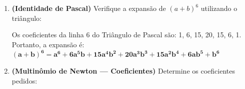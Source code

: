 \documentclass[12pt]{article}
\begin{document}
\begin{enumerate}
\begin{solucao}
\begin{enumerate}[label=\alph*)]
    \item \textbf{5º termo de $(2x + y)^8$:} \\
    $T_{k+1} = \binom{n}{k}a^{n-k}b^k$. Para o 5º termo, $k = 4$. \\
    $T_5 = \binom{8}{4}(2x)^{8-4}(y)^4 = 70 \cdot (2x)^4 \cdot y^4 = 70 \cdot 16x^4 \cdot y^4 = \mathbf{1120x^4y^4}$

    \item \textbf{Coeficiente de $x^3$ em $(1 + 3x)^7$:} \\
    $T_{k+1} = \binom{7}{k}(1)^{7-k}(3x)^k = \binom{7}{k} 3^k x^k$. \\
    Para $x^3$, temos $k = 3$. \\
    $T_4 = \binom{7}{3} 3^3 x^3 = 35 \cdot 27 x^3 = 945 x^3$. \\
    O coeficiente é \textbf{945}.

    \item \textbf{Termo independente de $x$ em $(x^2 - 1/x)^9$:} \\
    $T_{k+1} = \binom{9}{k}(x^2)^{9-k}(-x^{-1})^k = \binom{9}{k} x^{18-2k} (-1)^k x^{-k} = \binom{9}{k} (-1)^k x^{18-3k}$. \\
    Para o termo independente, o expoente de $x$ deve ser zero: \\
    $18 - 3k = 0 \implies 3k = 18 \implies k = 6$. \\
    $T_7 = \binom{9}{6}(-1)^6 = \frac{9 \cdot 8 \cdot 7}{3 \cdot 2 \cdot 1} \cdot 1 = 84$. \\
    O termo independente é \textbf{84}.
\end{enumerate}
\end{solucao}

\item \textbf{(Identidade de Pascal)} Verifique a expansão de $(a+b)^6$ utilizando o triângulo:

\begin{solucao}
Os coeficientes da linha 6 do Triângulo de Pascal são: 1, 6, 15, 20, 15, 6, 1. \\
Portanto, a expansão é: \\
$\mathbf{(a+b)^6 = a^6 + 6a^5b + 15a^4b^2 + 20a^3b^3 + 15a^2b^4 + 6ab^5 + b^6}$
\end{solucao}

\item \textbf{(Multinômio de Newton — Coeficientes)} Determine os coeficientes pedidos:


\end{enumerate}
\end{document}
